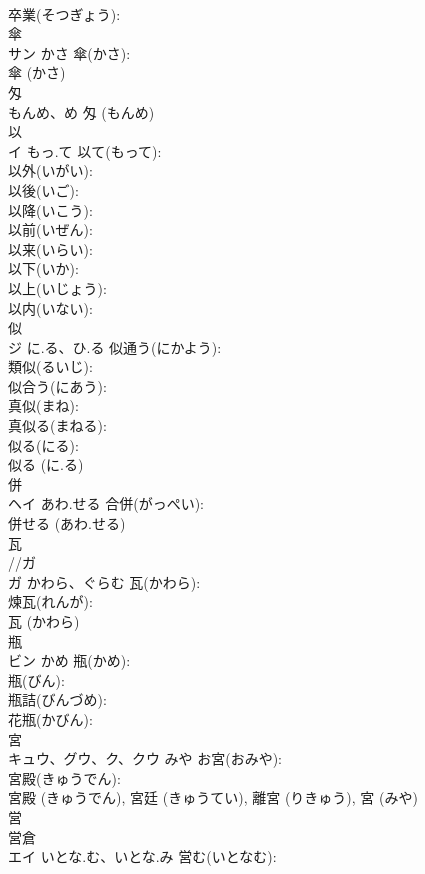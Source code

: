 \documentclass[8pt]{extreport}
\begin{document}
\begin{CJK}{UTF8}{min}
\\	卒業(そつぎょう): 
\\	傘			
\\	サン	かさ	傘(かさ): 
\\	傘 (かさ)
\\	匁			
\\	もんめ、め		匁 (もんめ)
\\	以			
\\	イ	もっ.て	以て(もって): 
\\	以外(いがい): 
\\	以後(いご): 
\\	以降(いこう): 
\\	以前(いぜん): 
\\	以来(いらい): 
\\	以下(いか): 
\\	以上(いじょう): 
\\	以内(いない): 
\\	似			
\\	ジ	に.る、ひ.る	似通う(にかよう): 
\\	類似(るいじ): 
\\	似合う(にあう): 
\\	真似(まね): 
\\	真似る(まねる): 
\\	似る(にる): 
\\	似る (に.る)
\\	併			
\\	ヘイ	あわ.せる	合併(がっぺい): 
\\	併せる (あわ.せる)
\\	瓦			
\\	//ガ 
\\	ガ	かわら、ぐらむ	瓦(かわら): 
\\	煉瓦(れんが): 
\\	瓦 (かわら)
\\	瓶			
\\	ビン	かめ	瓶(かめ): 
\\	瓶(びん): 
\\	瓶詰(びんづめ): 
\\	花瓶(かびん): 
\\	宮			
\\	キュウ、グウ、ク、クウ	みや	お宮(おみや): 
\\	宮殿(きゅうでん): 
\\	宮殿 (きゅうでん), 宮廷 (きゅうてい), 離宮 (りきゅう), 宮 (みや)
\\	営			
\\	営倉 
\\	エイ	いとな.む、いとな.み	営む(いとなむ): 

\end{CJK}
\end{document}

